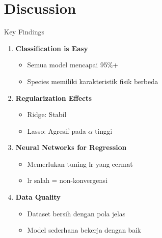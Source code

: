 \documentclass[aspectratio=169]{beamer}
\begin{document}
\section{Discussion}

\begin{frame}{Key Findings}
\fontsize{10}{11}\selectfont

\begin{enumerate}
    \item \textbf{Classification is Easy}
    \begin{itemize}
        \item Semua model mencapai 95\%+
        \item Species memiliki karakteristik fisik berbeda
    \end{itemize}
    
    \item \textbf{Regularization Effects}
    \begin{itemize}
        \item Ridge: Stabil
        \item Lasso: Agresif pada $\alpha$ tinggi
    \end{itemize}
    
    \item \textbf{Neural Networks for Regression}
    \begin{itemize}
        \item Memerlukan tuning lr yang cermat
        \item lr salah = non-konvergensi
    \end{itemize}
    
    \item \textbf{Data Quality}
    \begin{itemize}
        \item Dataset bersih dengan pola jelas
        \item Model sederhana bekerja dengan baik
    \end{itemize}
\end{enumerate}
\end{frame}
\end{document}
